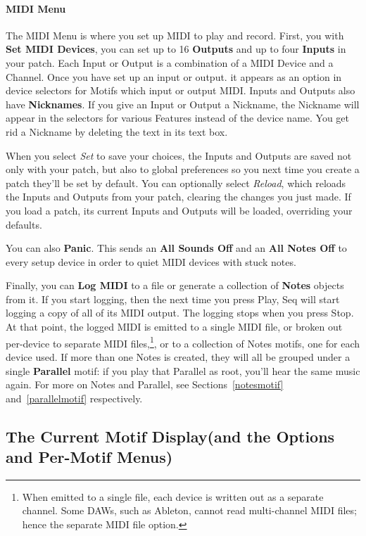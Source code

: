 \documentclass[twoside,10pt]{article}
\begin{document}
\paragraph{MIDI Menu}

The MIDI Menu is where you set up MIDI to play and record.  First, you with {\bf Set MIDI Devices}, you can set up to 16 {\bf Outputs} and up to four {\bf Inputs} in your patch.  Each Input or Output is a combination of a MIDI Device and a Channel.  Once you have set up an input or output. it appears as an option in device selectors for Motifs which input or output MIDI.  Inputs and Outputs also have {\bf Nicknames}.  If you give an Input or Output a Nickname, the Nickname will appear in the selectors for various Features instead of the device name.  You get rid a Nickname by deleting the text in its text box.

When you select {\it Set} to save your choices, the Inputs and Outputs are saved not only with your patch, but also to global preferences so you next time you create a patch they'll be set by default.  You can optionally select {\it Reload}, which reloads the Inputs and Outputs from your patch, clearing the changes you just made.  If you load a patch, its current Inputs and Outputs will be loaded, overriding your defaults.

You can also {\bf Panic}.  This sends an {\bf All Sounds Off} and an {\bf All Notes Off} to every setup device in order to quiet MIDI devices with stuck notes.

Finally, you can {\bf Log MIDI} to a file or generate a collection of {\bf Notes} objects from it.  If you start logging, then the next time you press Play, Seq will start logging a copy of all of its MIDI output.  The logging stops when you press Stop.  At that point, the logged MIDI is emitted to a single MIDI file, or broken out per-device to separate MIDI files,\footnote{When emitted to a single file, each device is written out as a separate channel.  Some DAWs, such as Ableton, cannot read multi-channel MIDI files; hence the separate MIDI file option.}, or to a collection of Notes motifs, one for each device used.  If more than one Notes is created, they will all be grouped under a single {\bf Parallel} motif: if you play that Parallel as root, you'll hear the same music again.  For more on Notes and Parallel, see Sections~\ref{notesmotif} and~\ref{parallelmotif} respectively.

\subsection{The Current Motif Display\quad (and the Options and Per-Motif Menus)}
\end{document}
